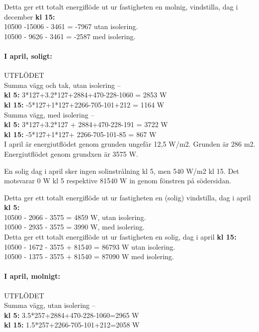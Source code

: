 Detta ger ett totalt energiflöde ut ur fastigheten en molnig, vindstilla, dag i december \textbf{kl 15:}\\
10500 -15006 - 3461 = -7967 utan isolering.\\
10500 - 9626 - 3461 = -2587 med isolering.\\


\paragraph{I april, soligt:}
UTFLÖDET\\
Summa vägg och tak, utan isolering –\\
\textbf{kl 5:} 3*127+3.2*127+2884+470-228-1060 = 2853 W\\
\textbf{kl 15:} -5*127+1*127+2266-705-101+212 = 1164 W\\

Summa vägg, med isolering –\\
\textbf{kl 5:} 3*127+3.2*127 + 2884+470-228-191 = 3722 W\\
\textbf{kl 15:} -5*127+1*127+ 2266-705-101-85 = 867 W\\

I april är energiutflödet genom grunden ungefär 12,5 W/m2. Grunden är 286 m2.\\
Energiutflödet genom grundxen är 3575 W.

En solig dag i april sker ingen solinstrålning kl 5, men 540 W/m2 kl 15. Det motsvarar 0 W kl 5 respektive 81540 W in genom fönstren på södersidan.

Detta ger ett totalt energiflöde ut ur fastigheten en (solig) vindstilla, dag i april \textbf{kl 5:}\\
10500 - 2066 - 3575 =  4859 W, utan isolering.\\
10500 - 2935 - 3575 =  3990 W, med isolering.\\

Detta ger ett totalt energiflöde ut ur fastigheten en solig, dag i april \textbf{kl 15:}\\
10500 - 1672 - 3575 + 81540 = 86793 W utan isolering.\\
10500 - 1375 - 3575 + 81540  =  87090 W med isolering.\\



\paragraph{I april, molnigt:}
UTFLÖDET\\
Summa vägg, utan isolering –\\
\textbf{kl 5:} 3.5*257+2884+470-228-1060=2965 W\\
\textbf{kl 15:} 1.5*257+2266-705-101+212=2058 W\\

